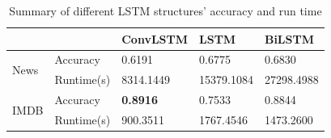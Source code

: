 \documentclass[11pt]{scrartcl}
\begin{document}
\begin{itemize}
\begin{table}[H]
\centering
\begin{tabular}{|l|l|l|l|l|}
\hline
                 & &ConvLSTM  &LSTM  &BiLSTM    \\ \hline
\multirow{2}{*}{News} & Accuracy &0.6191  &0.6775  &0.6830  \\ \cline{2-5} 
                  &Runtime(s)  & 8314.1449 &15379.1084  &27298.4988  \\ \hline
\multirow{2}{*}{IMDB} & Accuracy &\textbf{0.8916}  &0.7533  &0.8844  \\ \cline{2-5} 
                  &Runtime(s)  &900.3511  &1767.4546  &1473.2600  \\ \hline
\end{tabular}
\caption{Summary of different LSTM structures' accuracy and run time}
\label{acc}
\end{table} 


\end{itemize}
\end{document}
